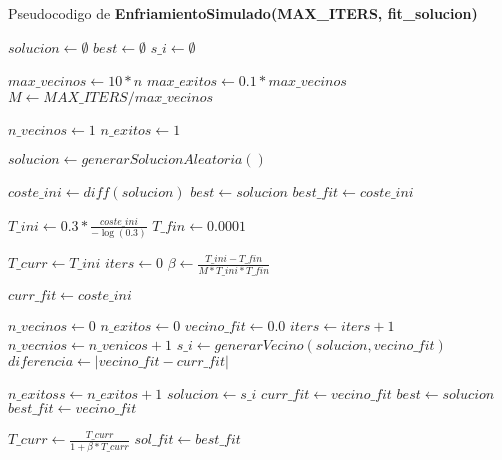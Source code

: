      Pseudocodigo de \textbf{EnfriamientoSimulado(MAX\_ITERS, fit\_solucion)}
     \begin{algorithm}[H]
       \begin{algorithmic}[1]
          \State $solucion \gets \emptyset$
          \State $best \gets \emptyset$
          \State $s\_i \gets \emptyset$

          \State $max\_vecinos \gets 10*n$
          \State $max\_exitos \gets 0.1 * max\_vecinos$
          \State $M \gets MAX\_ITERS / max\_vecinos$

          \State $n\_vecinos \gets 1$
          \State $n\_exitos \gets 1$

          \State $solucion \gets generarSolucionAleatoria()$

          \State $coste\_ini \gets  diff(solucion)$ 
          \State $best \gets solucion$
          \State $best\_fit \gets coste\_ini$

          \State $T\_ini \gets 0.3 * \frac{coste\_ini }{-\log(0.3)}$
          \State $T\_fin \gets 0.0001$

          \State $T\_curr \gets T\_ini$
          \State $iters \gets 0$
          \State $\beta \gets \frac{T\_ini - T\_fin}{M * T\_ini * T\_fin}$

          \State $curr\_fit \gets coste\_ini$

          \State $n\_vecinos \gets 0$
          \State $n\_exitos \gets 0$
              \State $vecino\_fit \gets 0.0$
              \State $iters \gets iters + 1$
              \State $n\_vecnios \gets n\_venicos + 1$
              \State $s\_i \gets generarVecino(solucion,vecino\_fit)$
              \State $diferencia \gets \lvert vecino\_fit - curr\_fit \rvert$

                \State $n\_exitoss \gets n\_exitos + 1 $
                \State $ solucion \gets s\_i$
                \State $curr\_fit \gets vecino\_fit$
                \State $best \gets solucion $
                \State $best\_fit \gets vecino\_fit $
                \EndIf  
              \EndIf
            \EndWhile

            \State $T\_curr \gets \frac{T\_curr}{1 + \beta * T\_curr} $
          \EndWhile
          \State $ sol\_fit \gets best\_fit$          
          \State {}
         \EndFunction
       \end{algorithmic}
     \end{algorithm}

